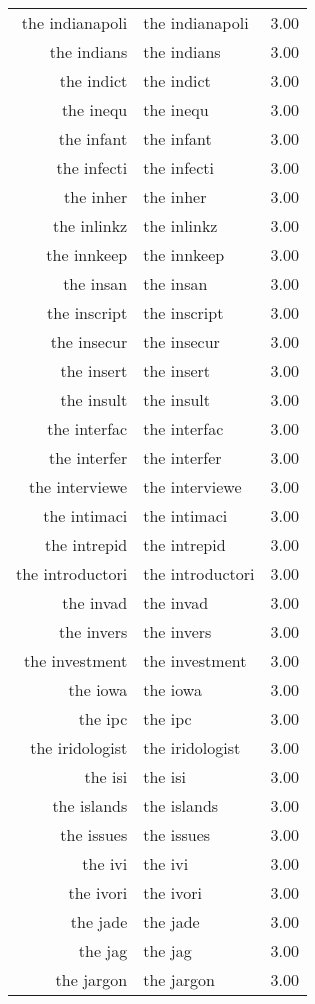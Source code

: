 \begin{table}[ht]
\begin{tabular}{rlr}
  the indianapoli & the indianapoli & 3.00 \\ 
  the indians & the indians & 3.00 \\ 
  the indict & the indict & 3.00 \\ 
  the inequ & the inequ & 3.00 \\ 
  the infant & the infant & 3.00 \\ 
  the infecti & the infecti & 3.00 \\ 
  the inher & the inher & 3.00 \\ 
  the inlinkz & the inlinkz & 3.00 \\ 
  the innkeep & the innkeep & 3.00 \\ 
  the insan & the insan & 3.00 \\ 
  the inscript & the inscript & 3.00 \\ 
  the insecur & the insecur & 3.00 \\ 
  the insert & the insert & 3.00 \\ 
  the insult & the insult & 3.00 \\ 
  the interfac & the interfac & 3.00 \\ 
  the interfer & the interfer & 3.00 \\ 
  the interviewe & the interviewe & 3.00 \\ 
  the intimaci & the intimaci & 3.00 \\ 
  the intrepid & the intrepid & 3.00 \\ 
  the introductori & the introductori & 3.00 \\ 
  the invad & the invad & 3.00 \\ 
  the invers & the invers & 3.00 \\ 
  the investment & the investment & 3.00 \\ 
  the iowa & the iowa & 3.00 \\ 
  the ipc & the ipc & 3.00 \\ 
  the iridologist & the iridologist & 3.00 \\ 
  the isi & the isi & 3.00 \\ 
  the islands & the islands & 3.00 \\ 
  the issues & the issues & 3.00 \\ 
  the ivi & the ivi & 3.00 \\ 
  the ivori & the ivori & 3.00 \\ 
  the jade & the jade & 3.00 \\ 
  the jag & the jag & 3.00 \\ 
  the jargon & the jargon & 3.00 \\ 

\end{tabular}
\end{table}
